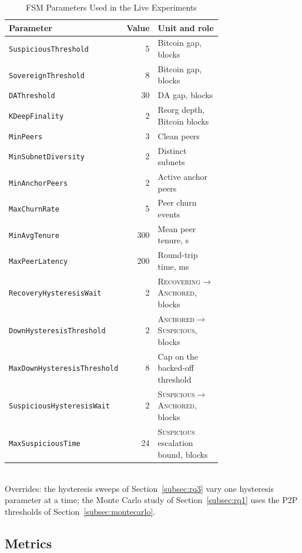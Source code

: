\begin{table}[h]
\caption{FSM Parameters Used in the Live Experiments}
\label{tab:fsm-params}
\centering
\footnotesize
\begin{tabular}{@{}p{0.34\linewidth}rp{0.38\linewidth}@{}}
\toprule
\textbf{Parameter} & \textbf{Value} & \textbf{Unit and role} \\
\midrule
\texttt{SuspiciousThreshold} & 5 & Bitcoin gap, blocks \\
\texttt{SovereignThreshold} & 8 & Bitcoin gap, blocks \\
\texttt{DAThreshold} & 30 & DA gap, blocks \\
\texttt{KDeepFinality} & 2 & Reorg depth, Bitcoin blocks \\
\texttt{MinPeers} & 3 & Clean peers \\
\texttt{MinSubnetDiversity} & 2 & Distinct subnets \\
\texttt{MinAnchorPeers} & 2 & Active anchor peers \\
\texttt{MaxChurnRate} & 5 & Peer churn events \\
\texttt{MinAvgTenure} & 300 & Mean peer tenure, s \\
\texttt{MaxPeerLatency} & 200 & Round-trip time, ms \\
\texttt{RecoveryHysteresisWait} & 2 & \textsc{Recovering}$\to$\textsc{Anchored}, blocks \\
\texttt{DownHysteresisThreshold} & 2 & \textsc{Anchored}$\to$\textsc{Suspicious}, blocks \\
\texttt{MaxDownHysteresisThreshold} & 8 & Cap on the backed-off threshold \\
\texttt{SuspiciousHysteresisWait} & 2 & \textsc{Suspicious}$\to$\textsc{Anchored}, blocks \\
\texttt{MaxSuspiciousTime} & 24 & \textsc{Suspicious} escalation bound, blocks \\
\bottomrule
\end{tabular}
\\[2pt]
\footnotesize Overrides: the hysteresis sweeps of Section~\ref{subsec:rq3}
vary one hysteresis parameter at a time; the Monte Carlo study of
Section~\ref{subsec:rq1} uses the P2P thresholds of
Section~\ref{subsec:montecarlo}.
\end{table}

\subsection{Metrics}
\label{subsec:metrics}

